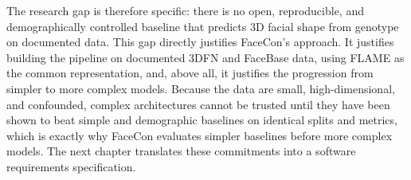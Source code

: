 The research gap is therefore specific: there is no open, reproducible, and demographically controlled baseline that predicts 3D facial shape from genotype on documented data. This gap directly justifies FaceCon's approach. It justifies building the pipeline on documented 3DFN and FaceBase data, using FLAME as the common representation, and, above all, it justifies the progression from simpler to more complex models. Because the data are small, high-dimensional, and confounded, complex architectures cannot be trusted until they have been shown to beat simple and demographic baselines on identical splits and metrics, which is exactly why FaceCon evaluates simpler baselines before more complex models. The next chapter translates these commitments into a software requirements specification.
